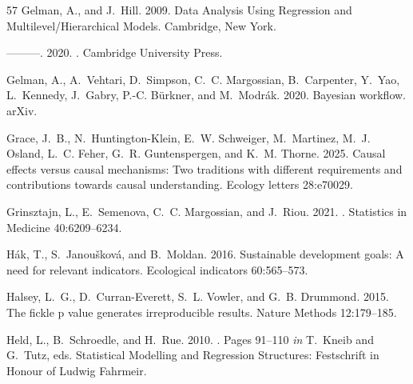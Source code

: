 \documentclass[11pt]{article}
\begin{document}
\begin{thebibliography}{57}
Gelman, A., and J.~Hill. 2009.
\newblock Data Analysis Using Regression and Multilevel/Hierarchical Models.
\newblock Cambridge, New York.

---{}---{}---. 2020.
.
\newblock Cambridge University Press.

Gelman, A., A.~Vehtari, D.~Simpson, C.~C. Margossian, B.~Carpenter, Y.~Yao,
  L.~Kennedy, J.~Gabry, P.-C. B{\"u}rkner, and M.~Modr{\'a}k. 2020.
\newblock Bayesian workflow.
\newblock arXiv.

Grace, J.~B., N.~Huntington-Klein, E.~W. Schweiger, M.~Martinez, M.~J. Osland,
  L.~C. Feher, G.~R. Guntenspergen, and K.~M. Thorne. 2025.
\newblock Causal effects versus causal mechanisms: Two traditions with
  different requirements and contributions towards causal understanding.
\newblock Ecology letters 28:e70029.

Grinsztajn, L., E.~Semenova, C.~C. Margossian, and J.~Riou. 2021.
.
\newblock Statistics in Medicine 40:6209--6234.

H{\'a}k, T., S.~Janou{\v{s}}kov{\'a}, and B.~Moldan. 2016.
\newblock Sustainable development goals: A need for relevant indicators.
\newblock Ecological indicators 60:565--573.

Halsey, L.~G., D.~Curran-Everett, S.~L. Vowler, and G.~B. Drummond. 2015.
\newblock The fickle p value generates irreproducible results.
\newblock Nature Methods 12:179--185.

Held, L., B.~Schroedle, and H.~Rue. 2010.
.
\newblock Pages 91--110 \emph{in} T.~Kneib and G.~Tutz, eds. Statistical
  Modelling and Regression Structures: Festschrift in Honour of Ludwig
  Fahrmeir.


\end{thebibliography}
\end{document}
